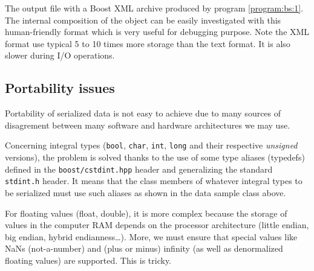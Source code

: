 \documentclass[a4paper,12pt]{article}
\newcommand{\basepath}{.}
\newcommand{\codingpath}{\basepath/coding}
\begin{document}
\begin{sample}[h]
\VerbatimInput[frame=single,
numbers=left,
numbersep=2pt,
firstline=1,
fontsize=\footnotesize,
showspaces=false]{\codingpath/stored_data.xml.out}
\caption{The output file with a  Boost XML archive produced by program
  \ref{program:bs:1}. The  internal composition  of the object  can be
  easily investigated  with this  human-friendly format which  is very
  useful for debugging  purpose. Note the XML format  use typical 5 to
  10 times more storage than the text format. It is also slower during
  I/O operations.  }
\label{sample:bs:1b}
\end{sample}

\clearpage

\subsection{Portability issues}

Portability  of serialized data  is not  easy to  achieve due  to many
sources   of   disagrement   between   many  software   and   hardware
architectures we may use.

Concerning    integral     types    (\texttt{bool},    \texttt{char},
\texttt{int},  \texttt{long}   and  their  respective  \emph{unsigned}
versions),  the problem  is  solved thanks  to  the use  of some  type
aliases  (typedefs) defined  in the  \texttt{boost/cstdint.hpp} header
and generalizing the standard  \texttt{stdint.h} header. It means that
the class members of whatever integral types to be serialized must use
such aliases as shown in the data sample class above.

For floating  values (float, double),  it is more  complex because
the storage  of values  in the computer  RAM depends on  the processor
architecture (little endian,  big endian, hybrid endianness\dots). More,
we must ensure that special  values like NaNs (not-a-number) and (plus
or  minus) infinity  (as  well as  denormalized  floating values)  are
supported. This is tricky.
\end{document}
